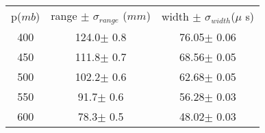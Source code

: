 
\begin{center}
\begin{tabulary}{\textwidth}{CCC}
\toprule

 p($mb$)& range $\pm$ $\sigma_{range}$ ($mm$) &  width $\pm$ $\sigma_{width}$($\mu$ s)\\
400&	124.0$\pm$  0.8&	76.05$\pm$	0.06\\
450&	111.8$\pm$	0.7&	68.56$\pm$	0.05\\
500&	102.2$\pm$	0.6&	62.68$\pm$	0.05\\
550&	91.7$\pm$	0.6&	56.28$\pm$	0.03\\
600&	78.3$\pm$	0.5&	48.02$\pm$	0.03\\



 \bottomrule
\end{tabulary}
\end{center}
